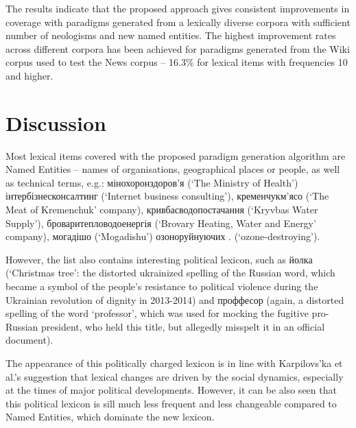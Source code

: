 \documentclass[11pt,a4paper]{article}
\begin{document}
The results indicate that the proposed approach gives consistent improvements in coverage with paradigms generated from a lexically diverse corpora with sufficient number of neologisms and new named entities. The highest improvement rates across different corpora has been achieved for paradigms generated from the Wiki corpus used to test the News corpus -- 16.3\% for lexical items with frequencies 10 and higher.


\section{Discussion}
\label{sec:Discussion}

Most lexical items covered with the proposed paradigm generation algorithm are Named Entities -- names of organisations, geographical places or people, as well as technical terms, e.g.: мінохоронздоров'я  (`The Ministry of Health') 
інтербізнесконсалтинг  (`Internet business consulting'), кременчукм'ясо  (`The Meat of Kremenchuk' company), кривбасводопостачання  (`Kryvbas Water Supply'), броваритепловодоенергія  (`Brovary Heating, Water and Energy' company), могадішо  (`Mogadishu')
озоноруйнуючих . (`ozone-destroying'). 

However, the list also contains interesting political lexicon, such as йолка  (`Christmas tree': the distorted ukrainized spelling of the Russian word, which became a symbol of the people's resistance to political violence during the Ukrainian revolution of dignity in 2013-2014) and проффесор  (again, a distorted spelling of the word `professor', which was used for mocking the fugitive pro-Russian president, who held this title, but allegedly misspelt it in an official document). 

The appearance of this politically charged lexicon is in line with Karpilovs'ka et al.'s  suggestion that lexical changes are driven by the social dynamics, especially at the times of major political developments. However, it can be also seen that this political lexicon is sill much less frequent and less changeable compared to Named Entities, which dominate the new lexicon.
\end{document}

